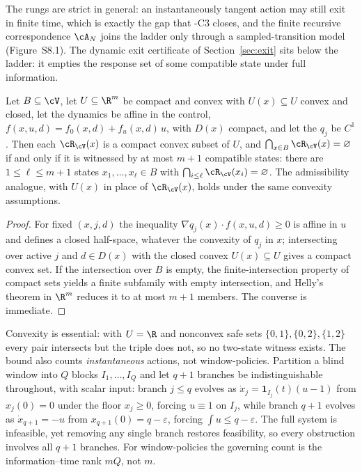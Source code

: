 The rungs are strict in general: an instantaneously tangent action may still exit in finite time, which is exactly the gap that \hyp{C3} closes, and the finite recursive correspondence $\cA_N$ joins the ladder only through a sampled-transition model (Figure~S8.1). The dynamic exit certificate of Section~\ref{sec:exit} sits below the ladder: it empties the response set of some compatible state under full information.

\begin{proposition}\label{prop:helly}
Let $B\subseteq\cV$, let $U\subseteq\R^m$ be compact and convex with $U(x)\subseteq U$ convex and closed, let the dynamics be affine in the control, $f(x,u,d)=f_0(x,d)+f_u(x,d)\,u$, with $D(x)$ compact, and let the $q_j$ be $C^1$. Then each $\cR_\cV(x)$ is a compact convex subset of $U$, and $\bigcap_{x\in B}\cR_\cV(x)=\varnothing$ if and only if it is witnessed by at most $m+1$ compatible states: there are $1\le\ell\le m+1$ states $x_1,\dots,x_\ell\in B$ with $\bigcap_{i\le\ell}\cR_\cV(x_i)=\varnothing$. The admissibility analogue, with $U(x)$ in place of $\cR_\cV(x)$, holds under the same convexity assumptions.
\end{proposition}

\begin{proof}
For fixed $(x,j,d)$ the inequality $\nabla q_j(x)\cdot f(x,u,d)\ge0$ is affine in $u$ and defines a closed half-space, whatever the convexity of $q_j$ in $x$; intersecting over active $j$ and $d\in D(x)$ with the closed convex $U(x)\subseteq U$ gives a compact convex set. If the intersection over $B$ is empty, the finite-intersection property of compact sets yields a finite subfamily with empty intersection, and Helly's theorem in $\R^m$ \citep{helly1923} reduces it to at most $m+1$ members. The converse is immediate.
\end{proof}

\begin{remark}\label{rem:count}
Convexity is essential: with $U=\R$ and nonconvex safe sets $\{0,1\},\{0,2\},\{1,2\}$ every pair intersects but the triple does not, so no two-state witness exists. The bound also counts \emph{instantaneous} actions, not window-policies. Partition a blind window into $Q$ blocks $I_1,\dots,I_Q$ and let $q+1$ branches be indistinguishable throughout, with scalar input: branch $j\le q$ evolves as $\dot x_j=\mathbf 1_{I_j}(t)(u-1)$ from $x_j(0)=0$ under the floor $x_j\ge0$, forcing $u\equiv1$ on $I_j$, while branch $q+1$ evolves as $\dot x_{q+1}=-u$ from $x_{q+1}(0)=q-\varepsilon$, forcing $\int u\le q-\varepsilon$. The full system is infeasible, yet removing any single branch restores feasibility, so every obstruction involves all $q+1$ branches. For window-policies the governing count is the information--time rank $mQ$, not $m$.
\end{remark}

